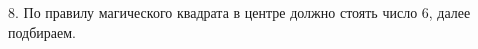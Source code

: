 8. По правилу магического квадрата в центре должно стоять число 6, далее подбираем.
\begin{center}
\begin{figure}[h!]
\end{figure}
\end{center}
